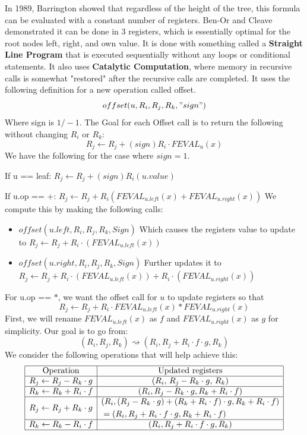 \documentclass[11pt]{article}
\theoremstyle{definition}
\begin{document}
In 1989, Barrington showed that regardless of the height of the tree, this formula can be evaluated with a constant number of registers. Ben-Or and Cleave demonstrated it can be done in 3 registers, which is essentially optimal for the root nodes left, right, and own value. It is done with something called a \textbf{Straight Line Program} that is executed sequentially without any loops or conditional statements. It also uses \textbf{Catalytic Computation}, where memory in recursive calls is somewhat "restored" after the recursive calls are completed. It uses the following definition for a new operation called offset.
$$offset(u,R_i,R_j,R_k, "sign")$$
Where sign is $1/-1$. The Goal for each Offset call is to return the following without changing $R_i$ or $R_k$:
$$R_j \leftarrow R_j+(sign)R_i \cdot FEVAL_u(x)$$
We have the following for the case where $sign = 1$.
\bigskip

If u == leaf: $R_j \leftarrow R_j + (sign)R_i(u.value)$
\bigskip

If u.op == +: $R_j \leftarrow R_j + R_i(FEVAL_{u.left}(x) + FEVAL_{u.right}(x))$ We compute this by making the following calls:
    \begin{itemize}
        \item $offset(u.left,R_i,R_j,R_k,Sign)$ Which causes the registers value to update to $R_j \leftarrow R_j + R_i \cdot (FEVAL_{u.left}(x))$
        \item $offset(u.right,R_i,R_j,R_k,Sign)$ Further updates it to \\$R_j \leftarrow R_j + R_i \cdot (FEVAL_{u.left}(x)) + R_i \cdot (FEVAL_{u.right}(x))$
    \end{itemize}
    For u.op == $*$, we want the offset call for $u$ to update registers so that $$R_j \leftarrow R_j + R_i \cdot FEVAL_{u.left}(x) * FEVAL_{u.right}(x)$$
    First, we will rename $FEVAL_{u.left}(x)$ as $f$ and $FEVAL_{u.right}(x)$ as $g$ for simplicity. Our goal is to go from:
    $$(R_i,R_j,R_k) \rightsquigarrow (R_i, R_j + R_i \cdot f \cdot g, R_k)$$
    We consider the following operations that will help achieve this:
    \[
    \begin{array}{|c|c|}
    \hline
    \text{Operation} & \text{Updated registers} \\
    \hline
    R_j \leftarrow R_j - R_k \cdot g & (R_i,\, R_j - R_k \cdot g,\, R_k) \\
    \hline
    R_k \leftarrow R_k + R_i \cdot f & (R_i, R_j - R_k \cdot g, R_k + R_i \cdot f)\\
    \hline
    R_j \leftarrow R_j + R_k \cdot g & \begin{aligned}
        &(R_i,(R_j - R_k\cdot g) + (R_k + R_i \cdot f)\cdot g, R_k + R_i \cdot f)\\
        &= (R_i, R_j + R_i\cdot f\cdot g, R_k + R_i\cdot f)
    \end{aligned}\\
    \hline
    R_k \leftarrow R_k - R_i \cdot f & (R_i, R_j + R_i \cdot f \cdot g, R_k)\\
    \hline
    \end{array}
    \]
\end{document}
